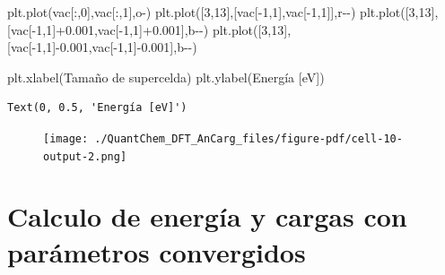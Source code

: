 \documentclass[
  letterpaper,
  DIV=11,
  numbers=noendperiod]{scrreprt}
\newenvironment{Shaded}{\begin{snugshade}}{\end{snugshade}}
\newcommand{\DecValTok}[1]{\textcolor[rgb]{0.68,0.00,0.00}{#1}}
\newcommand{\FloatTok}[1]{\textcolor[rgb]{0.68,0.00,0.00}{#1}}
\newcommand{\NormalTok}[1]{\textcolor[rgb]{0.00,0.23,0.31}{#1}}
\newcommand{\OperatorTok}[1]{\textcolor[rgb]{0.37,0.37,0.37}{#1}}
\newcommand{\StringTok}[1]{\textcolor[rgb]{0.13,0.47,0.30}{#1}}
\begin{document}
\begin{Shaded}
\begin{Highlighting}[]
\NormalTok{plt.plot(vac[:,}\DecValTok{0}\NormalTok{],vac[:,}\DecValTok{1}\NormalTok{],}\StringTok{\textquotesingle{}o{-}\textquotesingle{}}\NormalTok{)}
\NormalTok{plt.plot([}\DecValTok{3}\NormalTok{,}\DecValTok{13}\NormalTok{],[vac[}\OperatorTok{{-}}\DecValTok{1}\NormalTok{,}\DecValTok{1}\NormalTok{],vac[}\OperatorTok{{-}}\DecValTok{1}\NormalTok{,}\DecValTok{1}\NormalTok{]],}\StringTok{\textquotesingle{}r{-}{-}\textquotesingle{}}\NormalTok{)}
\NormalTok{plt.plot([}\DecValTok{3}\NormalTok{,}\DecValTok{13}\NormalTok{],[vac[}\OperatorTok{{-}}\DecValTok{1}\NormalTok{,}\DecValTok{1}\NormalTok{]}\OperatorTok{+}\FloatTok{0.001}\NormalTok{,vac[}\OperatorTok{{-}}\DecValTok{1}\NormalTok{,}\DecValTok{1}\NormalTok{]}\OperatorTok{+}\FloatTok{0.001}\NormalTok{],}\StringTok{\textquotesingle{}b{-}{-}\textquotesingle{}}\NormalTok{)}
\NormalTok{plt.plot([}\DecValTok{3}\NormalTok{,}\DecValTok{13}\NormalTok{],[vac[}\OperatorTok{{-}}\DecValTok{1}\NormalTok{,}\DecValTok{1}\NormalTok{]}\OperatorTok{{-}}\FloatTok{0.001}\NormalTok{,vac[}\OperatorTok{{-}}\DecValTok{1}\NormalTok{,}\DecValTok{1}\NormalTok{]}\OperatorTok{{-}}\FloatTok{0.001}\NormalTok{],}\StringTok{\textquotesingle{}b{-}{-}\textquotesingle{}}\NormalTok{)}

\NormalTok{plt.xlabel(}\StringTok{\textquotesingle{}Tamaño de supercelda\textquotesingle{}}\NormalTok{)}
\NormalTok{plt.ylabel(}\StringTok{\textquotesingle{}Energía [eV]\textquotesingle{}}\NormalTok{)}
\end{Highlighting}
\end{Shaded}

\begin{verbatim}
Text(0, 0.5, 'Energía [eV]')
\end{verbatim}

\begin{figure}[H]

{\centering \texttt{[image: ./QuantChem\_DFT\_AnCarg\_files/figure-pdf/cell-10-output-2.png]}

}

\end{figure}

\hypertarget{calculo-de-energuxeda-y-cargas-con-paruxe1metros-convergidos}{%
\section{Calculo de energía y cargas con parámetros
convergidos}\label{calculo-de-energuxeda-y-cargas-con-paruxe1metros-convergidos}}
\end{document}
